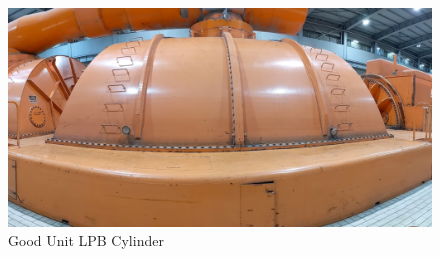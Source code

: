 \documentclass{UoNMCHA}
\numberwithin{equation}{section}
\begin{document}
    \begin{figure}[H]
        \centering
        \includegraphics[keepaspectratio, width = \textwidth]{Figures/U6_LPB_Centre.png}
        \caption{Good Unit LPB Cylinder}
    \end{figure}
\end{document}
